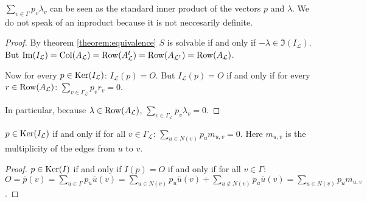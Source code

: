 \begin{remark}
	$\sum_{v\in\Gamma} p_{v}\lambda_{v}$ can be seen as the standard inner
	product of the vectors $p$ and $\lambda$. We do not speak of an
	inproduct because it is not neccesarily definite.
\end{remark}

\begin{proof}
	By theorem \ref{theorem:equivalence} $S$ is solvable if and only if
	$-\lambda \in \Im(I_{\mathcal{L}})$. But $\operatorname{Im}(I_{\mathcal{L}}) =
	\operatorname{Col}(A_{\mathcal{L}}) = \operatorname{Row}(A_{\mathcal{L}}^{t}) =
	\operatorname{Row}(A_{\mathcal{L}^{t}}) = \operatorname{Row}(A_{\mathcal{L}})$. 
	
	Now for every $p\in\operatorname{Ker}(I_{\mathcal{L}})$: $I_{\mathcal{L}}(p)=O$. But
	$I_{\mathcal{L}}(p)=O$ if and only if for every
	$r\in\operatorname{Row}(A_{\mathcal{L}})$: $\sum_{v\in\Gamma_{\mathcal{L}}} p_{v}r_{v}
	= 0$.
	
	In particular, because $\lambda\in\operatorname{Row}(A_{\mathcal{L}})$,
	$\sum_{v\in\Gamma_{\mathcal{L}}} p_{v}\lambda_{v} = 0$.
\end{proof}

\begin{theorem}\label{theorem:kercharacterization}
	$p \in \operatorname{Ker}(I_{\mathcal{L}})$ if and only if for all
	$v\in\Gamma_{\mathcal{L}}$: $\sum_{u\in N(v)} p_{u}m_{u,v} = 0$.
	Here $m_{u,v}$ is the multiplicity of the edges from $u$ to $v$.
\end{theorem}

\begin{proof}
	$p \in \operatorname{Ker}(I)$ if and only if $I(p) = O$ if and only if for all
	$v\in\Gamma$: $O = \overline{p}(v) = \sum_{u\in\Gamma}
	p_{u}\overline{u}(v) = \sum_{u\in N(v)} p_{u}\overline{u}(v) +
	\sum_{u\not\in N(v)} p_{u}\overline{u}(v) = \sum_{u\in N(v)}
	p_{u}m_{u,v}$. 
\end{proof}

